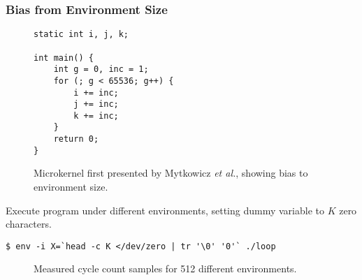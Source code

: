\documentclass{beamer}
\begin{document}
\begin{frame}
\frametitle{Bias from Environment Size}

\begin{figure}
  \begin{lstlisting}[frame=single, xleftmargin=.01\textwidth, xrightmargin=.01\textwidth]
static int i, j, k;

int main() {
    int g = 0, inc = 1;
    for (; g < 65536; g++) {
        i += inc;
        j += inc;
        k += inc;
    }
    return 0;
}
  \end{lstlisting}
  \caption{\label{fig:microkernel}Microkernel first presented by Mytkowicz \emph{et al.}\cite{Mytkowicz:2009:WrongData}, showing bias to environment size.}
\end{figure}

\framebreak

Execute program under different environments, setting dummy variable to $K$ zero characters.

\begin{lstlisting}[breaklines=true, belowskip=-10pt, basicstyle=\ttfamily\small]
$ env -i X=`head -c K </dev/zero | tr '\0' '0'` ./loop
\end{lstlisting}

\begin{figure}
  \caption{Measured cycle count samples for 512 different environments.}
\end{figure}



\end{frame}
\end{document}
